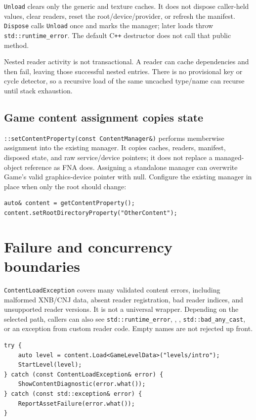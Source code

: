 \texttt{Unload} clears only the generic and texture caches. It does not dispose caller-held
values, clear readers, reset the root/device/provider, or refresh the manifest.
\texttt{Dispose} calls \texttt{Unload} once and marks the manager; later loads throw
\texttt{std::runtime\_error}. The default C\texttt{++} destructor does not call that public
method.

Nested reader activity is not transactional. A reader can cache dependencies and then fail,
leaving those successful nested entries. There is no provisional key or cycle detector, so a
recursive load of the same uncached type/name can recurse until stack exhaustion.

\subsection{Game content assignment copies state}

\texttt{::setContentProperty(const ContentManager\&)} performs memberwise assignment into
the existing manager. It copies caches, readers, manifest, disposed state, and raw service/device
pointers; it does not replace a managed-object reference as FNA does. Assigning a standalone
manager can overwrite Game's valid graphics-device pointer with null. Configure the existing
manager in place when only the root should change:

\begin{lstlisting}
auto& content = getContentProperty();
content.setRootDirectoryProperty("OtherContent");
\end{lstlisting}

\section{Failure and concurrency boundaries}

\texttt{ContentLoadException} covers many validated content errors, including malformed XNB/CNJ
data, absent reader registration, bad reader indices, and unsupported reader versions. It is not
a universal wrapper. Depending on the selected path, callers can also see
\texttt{std::runtime\_error}, ,
, \texttt{std::bad\_any\_cast}, or an exception from custom
reader code. Empty names are not rejected up front.

\begin{lstlisting}
try {
    auto level = content.Load<GameLevelData>("levels/intro");
    StartLevel(level);
} catch (const ContentLoadException& error) {
    ShowContentDiagnostic(error.what());
} catch (const std::exception& error) {
    ReportAssetFailure(error.what());
}
\end{lstlisting}

